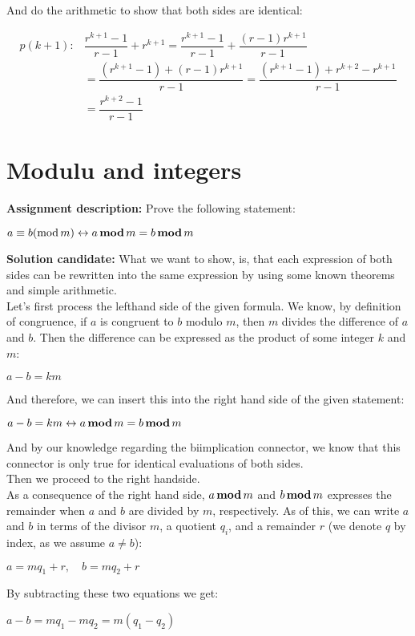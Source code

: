 \documentclass{report}
\newcommand{\cent}[1]{\begin{center}#1\end{center}}
\newcommand{\mAlign}[1]{\begin{align*}#1\end{align*}}
\newcommand{\AssignmentDescription}{\textbf{Assignment description: }}
\newcommand{\Solution}{\textbf{Solution candidate: }}
\newcommand{\QED}{\boxed{}}
\newcommand{\modInline}{\text{mod\,}}
\newcommand{\modFunc}{\text{\,\textbf{mod}\,}}
\begin{document}
 	And do the arithmetic to show that both sides are identical:
 	
 	\mAlign{
 		p(k+1) : &\dfrac{r^{k+1} - 1}{r-1} + r^{k+1} = \dfrac{r^{k+1} - 1}{r-1} + \dfrac{(r-1)r^{k+1}}{r-1} \\
 		&=  \dfrac{(r^{k+1} - 1) + (r-1)r^{k+1}}{r-1} = \dfrac{(r^{k+1} - 1) + r^{k+2} -r^{k+1}}{r-1} \\
 		&= \dfrac{ r^{k+2}-1}{r-1}
 	}
 	
 	\QED
 	\section{Modulu and integers}
 	\AssignmentDescription Prove the following statement:
 	\cent{$a \equiv b (\modInline m) \leftrightarrow a \modFunc m = b \modFunc m$}
 	
 	\Solution
 	What we want to show, is, that each expression of both sides can be rewritten into  the same expression by using some known theorems and simple arithmetic.\\
 	
 	Let's first process the lefthand side of the given formula. We know, by definition of congruence, if $a$ is congruent to $b$ modulo $m$, then $m$ divides the difference of $a$ and $b$. Then the difference can be expressed as the product of some integer $k$ and $m$:
 	
 	\cent{$a-b = km$}
 	
 	And therefore, we can insert this into the right hand side of the given statement:
 	
 	\cent{$a-b=km \leftrightarrow a \modFunc m = b \modFunc m$}
 	
 	And by our knowledge regarding the biimplication connector, we know that this connector is only true for identical evaluations of both sides.\\
 	
 	Then we proceed to the right handside.\\
 	
 	As a consequence of the right hand side, $a \modFunc m$ and $b \modFunc m$ expresses the remainder when $a$ and $b$ are divided by $m$, respectively. As of this, we can write $a$ and $b$ in terms of the divisor $m$, a quotient $q_i$, and a remainder $r$ (we denote $q$ by index, as we assume $a\neq b$):
 	
 	\cent{$a = m q_1 + r, \quad b = m q_2 + r$}
	
	By subtracting these two equations we get:
	
	\cent{$a - b = mq_1 - mq_2 = m(q_1 - q_2)$}
	
\end{document}
